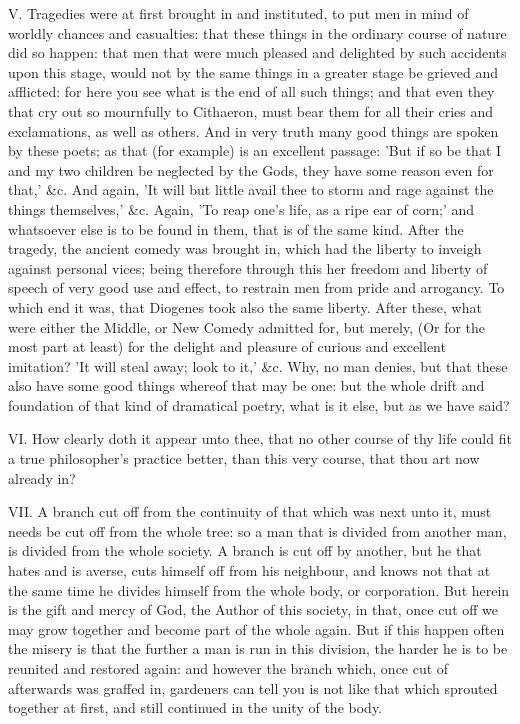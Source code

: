 V. Tragedies were at first brought in and instituted, to put men in mind
of worldly chances and casualties: that these things in the ordinary
course of nature did so happen: that men that were much pleased and
delighted by such accidents upon this stage, would not by the same things
in a greater stage be grieved and afflicted: for here you see what is the
end of all such things; and that even they that cry out so mournfully to
Cithaeron, must bear them for all their cries and exclamations, as well as
others. And in very truth many good things are spoken by these poets; as
that (for example) is an excellent passage: 'But if so be that I and my
two children be neglected by the Gods, they have some reason even for
that,' \&c. And again, 'It will but little avail thee to storm and rage
against the things themselves,' \&c. Again, 'To reap one's life, as a
ripe ear of corn;' and whatsoever else is to be found in them, that is of
the same kind. After the tragedy, the ancient comedy was brought in, which
had the liberty to inveigh against personal vices; being therefore through
this her freedom and liberty of speech of very good use and effect, to
restrain men from pride and arrogancy. To which end it was, that Diogenes
took also the same liberty. After these, what were either the Middle, or
New Comedy admitted for, but merely, (Or for the most part at least) for
the delight and pleasure of curious and excellent imitation? 'It will
steal away; look to it,' \&c. Why, no man denies, but that these also
have some good things whereof that may be one: but the whole drift and
foundation of that kind of dramatical poetry, what is it else, but as we
have said?

VI. How clearly doth it appear unto thee, that no other course of thy
life could fit a true philosopher's practice better, than this very
course, that thou art now already in?

VII. A branch cut off from the continuity of that which was next unto
it, must needs be cut off from the whole tree: so a man that is divided
from another man, is divided from the whole society. A branch is cut off
by another, but he that hates and is averse, cuts himself off from his
neighbour, and knows not that at the same time he divides himself from the
whole body, or corporation. But herein is the gift and mercy of God, the
Author of this society, in that, once cut off we may grow together and
become part of the whole again. But if this happen often the misery is
that the further a man is run in this division, the harder he is to be
reunited and restored again: and however the branch which, once cut of
afterwards was graffed in, gardeners can tell you is not like that which
sprouted together at first, and still continued in the unity of the body.

